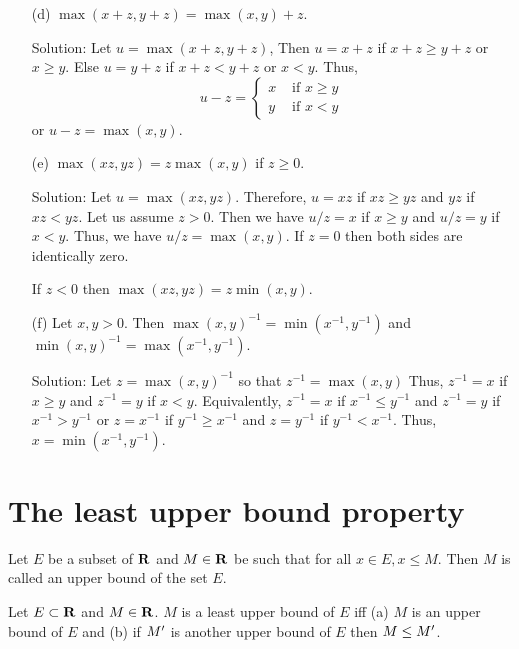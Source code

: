 \begin{enumerate}
\begin{enumerate}
\item[(d)] $\max(x + z, y + z) = \max(x, y) + z$.
\item[Solution:] Let $u = \max(x + z, y + z)$, Then $u = x + z$ if
$x + z \ge y + z$ or $x \ge y$. Else $u = y + z$ if $x + z < y + z$ or
$x < y$. Thus,
\[
u - z = \begin{cases}
x & \text{ if } x \ge y \\
y & \text{ if } x < y
\end{cases}
\]
or $u - z = \max(x, y)$.

\item[(e)] $\max(xz, yz) = z\max(x, y)$ if $z \ge 0$.
\item[Solution:] Let $u = \max(xz, yz)$. Therefore, $u = xz$ if $xz \ge
yz$ and $yz$ if $xz < yz$. Let us assume $z > 0$. Then we have $u/z = x$
if $x \ge y$ and $u/z = y$ if $x < y$. Thus, we have $u/z = \max(x, y)$.
If $z = 0$ then both sides are identically zero.

If $z < 0$ then $\max(xz, yz) = z\min(x, y)$.

\item[(f)] Let $x, y > 0$. Then $\max(x, y)^{-1} = \min(x^{-1}, y^{-1})$
and $\min(x, y)^{-1} = \max(x^{-1}, y^{-1})$.
\item[Solution:] Let $z = \max(x, y)^{-1}$ so that $z^{-1} = \max(x, y)$
Thus, $z^{-1} = x$ if $x \ge y$ and $z^{-1} = y$ if $x < y$. Equivalently,
$z^{-1} = x$ if $x^{-1} \le y^{-1}$ and $z^{-1} = y$ if $x^{-1} > y^{-1}$
or $z = x^{-1}$ if $y^{-1} \ge x^{-1}$ and $z = y^{-1}$ if $y^{-1} <
x^{-1}$. Thus, $x = \min(x^{-1}, y^{-1})$.
\end{enumerate}
\end{enumerate}

\section{The least upper bound property}\label{c4s5}
\begin{defn}\label{c4s5d1}
Let $E$ be a subset of $\mathbf{R}$ and $M \in \mathbf{R}$ be such that for all $x \in
E, x \le M$. Then $M$ is called an upper bound of the set $E$.
\end{defn}

\begin{defn}\label{c4s5d2}
Let $E \subset \mathbf{R}$ and $M \in \mathbf{R}$. $M$ is a least upper bound of $E$
iff (a) $M$ is an upper bound of $E$ and (b) if $M^\prime$ is another upper
bound of $E$ then $M \le M^\prime$.
\end{defn}

